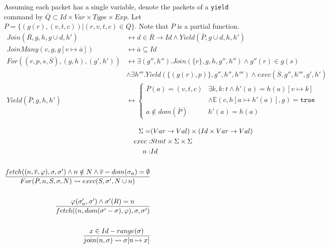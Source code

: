 \documentclass[acmsmall,review,anonymous]{acmart}\settopmatter{printfolios=true,printccs=false,printacmref=false}
\begin{document}
Assuming each packet has a single variable, denote the packets of a \texttt{yield} command by $\overline{Q} \subset Id \times Var \times Type \times Exp $.
Let $\overline{P} = \{ (g(r), (v, t, c))| (r, v, t, c) \in \overline{Q} \}$. Note that $\overline{P}$ is a partial function.
\begin{align*}
  Join(\overline{R}, g, h, g \cup d, h')
          & \leftrightarrow d \in \overline{R} \rightarrow Id \wedge Yield(\overline{P}, g \cup d, h, h') \\
  JoinMany(v, g, g[v\mapsto \overline{a}]) 
          & \leftrightarrow \overline{a} \subseteq Id \\
  For((r, p, s, \overline{S}), (g, h), (g', h')) 
          & \leftrightarrow \exists (g'', h'') . Join(\{r\}, g, h, g'', h'') \wedge g''(r) \in g(s) \\
          & \wedge \exists h''' . Yield(\{(g(r), p)\}, g'', h'', h''') \wedge exec(\overline{S}, g'', h''', g', h')  \\
  Yield(\overline{P}, g, h, h') 
          & \leftrightarrow  
            \begin{cases}
              \overline{P}(a) = (v, t, c) & \exists k, k : t \wedge h'(a) = h(a)[v \mapsto k] \\
              & \wedge \mathbb{E}(c, h[a \mapsto h'(a)], g) = \texttt{true} \\
              a \notin dom(\overline{P})  & h'(a) = h(a)
            \end{cases}
\end{align*}
    
\begin{align*}
  \Sigma =& (Var \rightarrow Val) \times (Id \times Var \rightarrow Val) \\
  exec :& Stmt \times \Sigma \times \Sigma \\
  n :& Id \\
  \\
  fetch((n, \overline{v}, \varphi), \sigma, \sigma') \wedge n \notin N \wedge \overline{v} - dom(\sigma_n) = \emptyset \over{
  For(P, n, S, \sigma, N) \rightsquigarrow exec(S, \sigma', N\cup n)                                                   }\\
  \\
  \varphi(\sigma'_n, \sigma') \wedge \sigma'(R) = n           \over{
  fetch((n, dom(\sigma'-\sigma), \varphi), \sigma, \sigma')   } \\
  \\
  x \in Id - range(\sigma)                                    \over{
  join(n, \sigma) \rightsquigarrow \sigma[n\mapsto x]         }
\end{align*}
\end{document}
